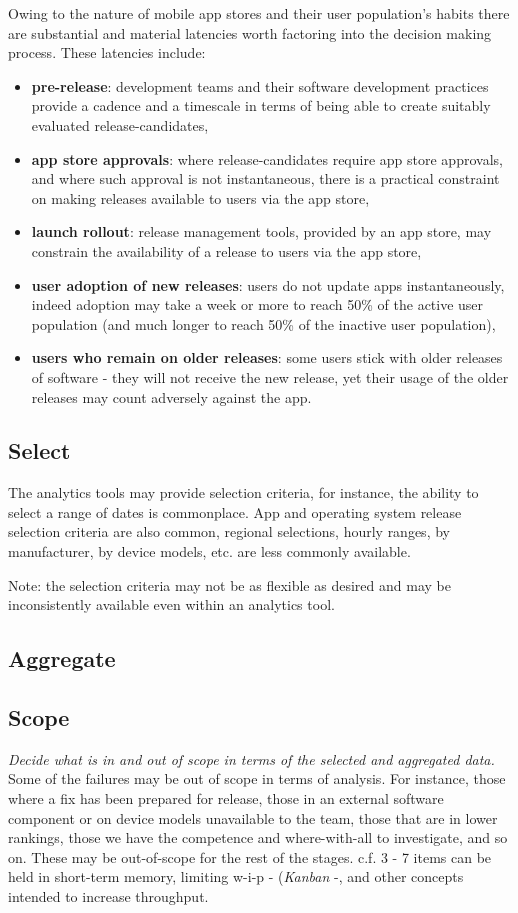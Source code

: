 Owing to the nature of mobile app stores and their user population's habits there are substantial and material latencies worth factoring into the decision making process. These latencies include:
\begin{itemize}
    \item \textbf{pre-release}: development teams and their software development practices provide a cadence and a timescale in terms of being able to create suitably evaluated release-candidates,
    \item \textbf{app store approvals}: where release-candidates require app store approvals, and where such approval is not instantaneous, there is a practical constraint on making releases available to users via the app store,
    \item \textbf{launch rollout}: release management tools, provided by an app store, may constrain the availability of a release to users via the app store,
    \item \textbf{user adoption of new releases}: users do not update apps instantaneously, indeed adoption may take a week or more to reach 50\% of the active user population (and much longer to reach 50\% of the inactive user population), 
    \item \textbf{users who remain on older releases}: some users stick with older releases of software - they will not receive the new release, yet their usage of the older releases may count adversely against the app.
\end{itemize}

\subsection{Select}
The analytics tools may provide selection criteria, for instance, the ability to select a range of dates is commonplace. App and operating system release selection criteria are also common, regional selections, hourly ranges, by manufacturer, by device models, etc. are less commonly available.

Note: the selection criteria may not be as flexible as desired and may be inconsistently available even within an analytics tool.

\subsection{Aggregate}

\subsection{Scope}
\emph{Decide what is in and out of scope in terms of the selected and aggregated data.} Some of the failures may be out of scope in terms of analysis. For instance, those where a fix has been prepared for release, those in an external software component or on device models unavailable to the team, those that are in lower rankings, those we have the competence and where-with-all to investigate, and so on. These may be out-of-scope for the rest of the stages. c.f. 3 - 7 items can be held in short-term memory, limiting w-i-p - (\emph{Kanban} -, and other concepts intended to increase throughput.

